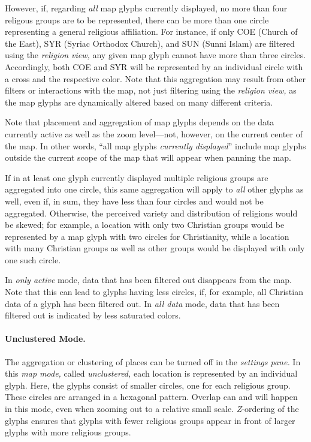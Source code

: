 However, if, regarding \emph{all} map glyphs currently displayed, no more than four religous groups are to be represented, there can be more than one circle representing a general religious affiliation.
For instance, if only COE (Church of the East), SYR (Syriac Orthodox Church), and SUN (Sunni Islam) are filtered using the \emph{religion view,} any given map glyph cannot have more than three circles.
Accordingly, both COE and SYR will be represented by an individual circle with a cross and the respective color.
Note that this aggregation may result from other filters or interactions with the map, not just filtering using the \emph{religion view,} as the map glyphs are dynamically altered based on many different criteria.

Note that placement and aggregation of map glyphs depends on the data currently active as well as the zoom level---not, however, on the current center of the map.
In other words, \enquote{all map glyphs \emph{currently displayed}} include map glyphs outside the current scope of the map that will appear when panning the map.

If in at least one glyph currently displayed multiple religious groups are aggregated into one circle, this same aggregation will apply to \emph{all} other glyphs as well, even if, in sum, they have less than four circles and would not be aggregated.
Otherwise, the perceived variety and distribution of religions would be skewed;
for example, a location with only two Christian groups would be represented by a map glyph with two circles for Christianity, while a location with many Christian groups as well as other groups would be displayed with only one such circle.

In \emph{only active} mode, data that has been filtered out disappears from the map.
Note that this can lead to glyphs having less circles, if, for example, all Christian data of a glyph has been filtered out.
In \emph{all data} mode, data that has been filtered out is indicated by less saturated colors.

\paragraph{Unclustered Mode.}
\label{sec:map-unclustered-mode}
The aggregation or clustering of places can be turned off in the \emph{settings pane.}
In this \emph{map mode,} called \emph{unclustered,} each location is represented by an individual glyph.
Here, the glyphs consist of smaller circles, one for each religious group.
These circles are arranged in a hexagonal pattern.
Overlap can and will happen in this mode, even when zooming out to a relative small scale.
\emph{Z}-ordering of the glyphs ensures that glyphs with fewer religious groups appear in front of larger glyphs with more religious groups.

